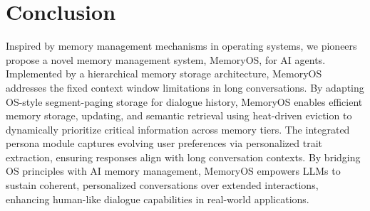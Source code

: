 \documentclass[11pt]{article}
\begin{document}



\section{Conclusion}
Inspired by memory management mechanisms in operating systems, we pioneers propose a novel memory management system, MemoryOS, for AI agents. Implemented by a hierarchical memory storage architecture, MemoryOS addresses the fixed context window limitations in long conversations.
By adapting OS-style segment-paging storage for dialogue history, MemoryOS enables efficient memory storage, updating, and semantic retrieval using heat-driven eviction to dynamically prioritize critical information across memory tiers. 
The integrated persona module captures evolving user preferences via personalized trait extraction, ensuring responses align with long conversation contexts.
By bridging OS principles with AI memory management, MemoryOS empowers LLMs to sustain coherent, personalized conversations over extended interactions, enhancing human-like dialogue capabilities in real-world applications.


\end{document}
